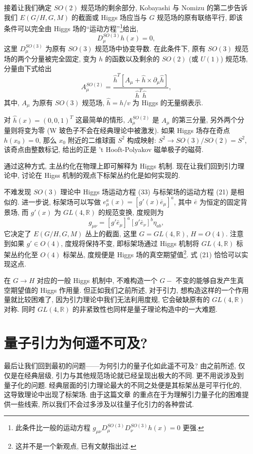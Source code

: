 \documentclass{article}
\begin{document}
接着让我们确定 $SO(2)$ 规范场的剩余部分, Kobayashi 与 Nomizu 的第二步告诉我们  $E(G/H,G,M)$ 的截面或 Higgs 场应当与 $G$ 规范场的原有联络平行, 即该条件可以完全由 Higgs 场的``运动方程''\footnote{此条件比一般的运动方程 $g_{\mu\nu}D_{\mu}^{SO(3)}D_{\nu}^{SO(3)}h(x)=0$ 更强.}给出,
\begin{equation}
D_{\mu}^{SO(3)}h(x)=0,
\end{equation}
这里 $D_{\mu}^{SO(3)}$ 为原有 $SO(3)$ 规范场中协变导数. 在此条件下, 原有 $SO(3)$ 规范场的两个分量被完全固定, 变为 $h$ 的函数以及剩余的 $SO(2)$ (或 $U(1)$) 规范场, 分量由下式给出
\begin{equation}
A_{\mu}^{SO(2)}=\frac{\hat{h}^{T}\left[A_{\mu}+\hat{h}\times \partial_{\mu}\hat{h}\right]}{\hat{h}^{T}\hat{h}},
\end{equation}
其中, $A_{\mu}$ 为原有 $SO(3)$ 规范场, $\hat{h}=h/v$ 为 Higgs 的无量纲表示.

对 $\hat{h}(x)=(0,0,1)^{T}$ 这最简单的情形, $A_{\mu}^{SO(2)}$ 是 $A_{\mu}$ 的第三分量, 另外两个分量则将变为零 (W 玻色子不会在经典理论中被激发). 如果 Higgs 场存在奇点 $h(x_{0})=0$, 那么 $x_{0}$ 附近的二维球面 $S^{2}$ 构成映射: $S^{2}\rightarrow SO(3)/SO(2)=S^{2}$, 该奇点由整数标记, 给出的正是 't Hooft-Polyakov 磁单极子的磁荷.

通过这种方式, 主丛约化在物理上即可解释为 Higgs 机制. 现在让我们回到引力理论中, 讨论在 Higss 机制的观点下标架丛约化是如何实现的.

不难发现 $SO(3)$ 理论中 Higgs 场运动方程 (33) 与标架场的运动方程 (21) 是相似的. 进一步说, 标架场可以写做 $e_{\mu}^{a}(x)=[g'(x)\bar{e}_{\mu}]^{a}$, 其中 $\bar{e}$ 为恒定的固定背景场, 而 $g'(x)$ 为 $GL(4,\mathbb{R})$ 的规范变换, 度规则为
\begin{equation}
g_{\mu\nu}=[g'\bar{e}_{\mu}]^{a}[g'\bar{e}_{\nu}]^{b}\eta_{ab},
\end{equation}
它决定了 $E(G/H,G,M)$ 丛上的截面, 这里 $G=GL(4, \mathbb{R})$, $H=O(4)$. 注意到如果  $g'\in O(4)$, 度规将保持不变, 即标架场通过 Higgs 机制将 $GL(4, \mathbb{R})$ 标架丛约化至 $O(4)$ 标架丛, 度规便是 Higgs 场的真空期望值\footnote{这并不是一个新观点, 已有文献指出过.}. 式 (21) 恰恰可以实现这点.

在 $G\rightarrow H$ 对应的一般 Higgs 机制中, 不难构造一个 $G-$ 不变的能够自发产生真空期望值的 Higgs 作用量. 但正如我们之前所述, 对于引力, 想构造这样的一个作用量就比较困难了, 因为引力理论中我们无法利用度规, 它会破缺原有的  $GL(4, \mathbb{R})$ 对称. 同时  $GL(4, \mathbb{R})$ 的非紧致性也同样是量子理论构造中的一大难题.
\section{量子引力为何遥不可及?}
最后让我们回到最初的问题——为何引力的量子化如此遥不可及? 由之前所述, 仅仅是在经典层级, 引力与其他规范场论就已经呈现出极大的不同. 更不用说涉及到量子化的问题. 经典层面的引力理论最大的不同之处便是其标架丛是可平行化的, 这导致理论中出现了标架场. 由于这篇文章 的重点在于为理解引力量子化的困难提供一些线索, 所以我们不会过多涉及以往量子化引力的各种尝试.
\end{document}
